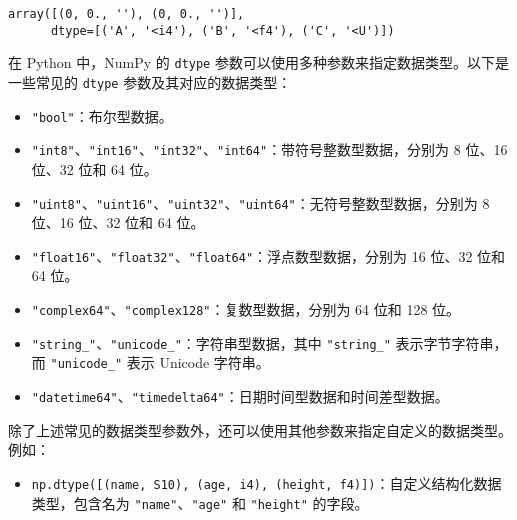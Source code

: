 \documentclass[11pt]{ctexart}
\makeatletter
\providecommand{\tightlist}{%
      \setlength{\itemsep}{0pt}\setlength{\parskip}{0pt}}
\newcommand{\boxspacing}{\kern\kvtcb@left@rule\kern\kvtcb@boxsep}
\newcommand{\prompt}[4]{
        {\ttfamily\llap{{\color{#2}[#3]:\hspace{3pt}#4}}\vspace{-\baselineskip}}
    }
\makeatother
\begin{document}
            \begin{tcolorbox}[breakable, size=fbox, boxrule=.5pt, pad at break*=1mm, opacityfill=0]
\prompt{Out}{outcolor}{230}{\boxspacing}
\begin{Verbatim}[commandchars=\\\{\}]
array([(0, 0., ''), (0, 0., '')],
      dtype=[('A', '<i4'), ('B', '<f4'), ('C', '<U')])
\end{Verbatim}
\end{tcolorbox}
        
    在 Python 中，NumPy 的 \texttt{dtype}
参数可以使用多种参数来指定数据类型。以下是一些常见的 \texttt{dtype}
参数及其对应的数据类型：

\begin{itemize}
\tightlist
\item
  \texttt{"bool"}：布尔型数据。
\item
  \texttt{"int8"}、\texttt{"int16"}、\texttt{"int32"}、\texttt{"int64"}：带符号整数型数据，分别为
  8 位、16 位、32 位和 64 位。
\item
  \texttt{"uint8"}、\texttt{"uint16"}、\texttt{"uint32"}、\texttt{"uint64"}：无符号整数型数据，分别为
  8 位、16 位、32 位和 64 位。
\item
  \texttt{"float16"}、\texttt{"float32"}、\texttt{"float64"}：浮点数型数据，分别为
  16 位、32 位和 64 位。
\item
  \texttt{"complex64"}、\texttt{"complex128"}：复数型数据，分别为 64
  位和 128 位。
\item
  \texttt{"string\_"}、\texttt{"unicode\_"}：字符串型数据，其中
  \texttt{"string\_"} 表示字节字符串，而 \texttt{"unicode\_"} 表示
  Unicode 字符串。
\item
  \texttt{"datetime64"}、\texttt{"timedelta64"}：日期时间型数据和时间差型数据。
\end{itemize}

除了上述常见的数据类型参数外，还可以使用其他参数来指定自定义的数据类型。例如：

\begin{itemize}
\tightlist
\item
  \texttt{np.dtype({[}(\textquotesingle{}name\textquotesingle{},\ \textquotesingle{}S10\textquotesingle{}),\ (\textquotesingle{}age\textquotesingle{},\ \textquotesingle{}i4\textquotesingle{}),\ (\textquotesingle{}height\textquotesingle{},\ \textquotesingle{}f4\textquotesingle{}){]})}：自定义结构化数据类型，包含名为
  \texttt{"name"}、\texttt{"age"} 和 \texttt{"height"} 的字段。
\end{itemize}
\end{document}
